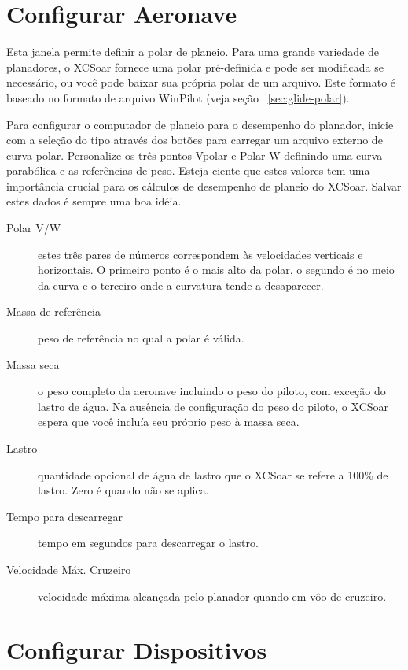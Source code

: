 \section{Configurar Aeronave}

Esta janela permite definir a polar de planeio.  Para uma grande variedade 
de planadores, o XCSoar fornece uma polar pré-definida e pode ser modificada se necessário, ou você pode baixar sua própria polar de um arquivo.  Este formato é baseado no formato de arquivo WinPilot (veja seção ~\ref{sec:glide-polar}).

\label{conf:polar} Para configurar o computador de planeio para o desempenho do planador, inicie com a seleção do tipo através dos botões     para carregar um arquivo externo de curva polar.
Personalize os três pontos Vpolar e Polar W definindo uma curva parabólica e as referências de peso.  Esteja ciente que estes valores tem uma importância crucial para os cálculos de desempenho de planeio do XCSoar.  \tip Salvar estes dados é sempre uma boa idéia.

\begin{description}
\item[Polar V/W]  estes três pares de números correspondem às velocidades verticais e horizontais.  O primeiro ponto é o mais alto da polar, o segundo é no meio da curva e o terceiro onde a curvatura tende a desaparecer.
\item[Massa de referência]  peso de referência no qual a polar é válida.
\item[Massa seca]  o peso completo da aeronave incluindo o peso do piloto, com exceção do lastro de água.  Na ausência de configuração do peso do piloto, o XCSoar espera que você incluía seu próprio peso à massa seca.
\item[Lastro] quantidade opcional de água de lastro que o XCSoar se refere a 100\% de lastro.  Zero é quando não se aplica.
\item[Tempo para descarregar]  tempo em segundos para descarregar o lastro.
\item[Velocidade Máx. Cruzeiro] velocidade máxima alcançada pelo planador quando em vôo de cruzeiro.
\end{description}


\section{Configurar Dispositivos} \label{conf:comdevices}

